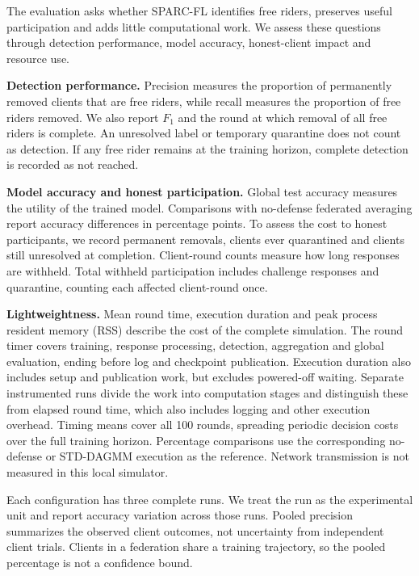 \documentclass[journal]{IEEEtran}
\makeatletter
\renewcommand{\subsection}{\@startsection{subsection}{2}{\z@}{1.5ex}{0.7ex}{\normalfont\normalsize\itshape}}
\makeatother
\begin{document}
\subsection{Evaluation Metrics}
The evaluation asks whether SPARC-FL identifies free riders, preserves
useful participation and adds little computational work. We assess these
questions through detection performance, model accuracy, honest-client
impact and resource use.

\textbf{Detection performance.} Precision measures the proportion of
permanently removed clients that are free riders, while recall measures
the proportion of free riders removed. We also report $F_1$ and the round at which removal
of all free riders is complete. An unresolved label or temporary quarantine
does not count as detection. If any free rider remains at the training
horizon, complete detection is recorded as not reached.

\textbf{Model accuracy and honest participation.} Global test accuracy
measures the utility of the trained model. Comparisons with no-defense
federated averaging report accuracy differences in percentage points.
To assess the cost to honest participants, we record permanent removals,
clients ever quarantined and clients still unresolved at completion.
Client-round counts measure how long responses are withheld. Total
withheld participation includes challenge responses and quarantine, counting
each affected client-round once.

\textbf{Lightweightness.} Mean round time, execution duration and peak
process resident memory (RSS) describe the cost of the complete simulation.
The round timer covers training, response processing, detection,
aggregation and global evaluation, ending before log and checkpoint
publication. Execution duration also includes setup and publication work,
but excludes powered-off waiting. Separate instrumented runs divide the
work into computation stages and distinguish these from elapsed round
time, which also includes logging and other execution overhead. Timing means
cover all 100 rounds, spreading periodic decision costs over the full
training horizon. Percentage comparisons use the corresponding
no-defense or STD-DAGMM execution as the reference. Network transmission
is not measured in this local simulator.

Each configuration has three complete runs. We treat the run as the
experimental unit and report accuracy variation across those runs.
Pooled precision summarizes the observed client outcomes, not uncertainty
from independent client trials. Clients in a federation share a training
trajectory, so the pooled percentage is not a confidence bound.
\end{document}
